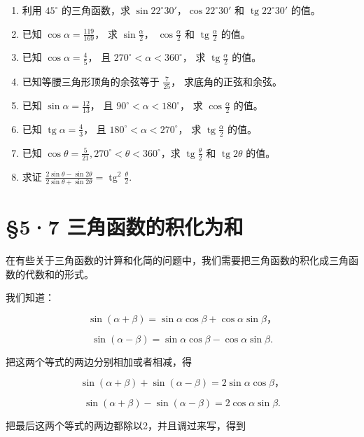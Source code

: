 \begin{enumerate}
\item
  利用 \(45^{\circ}\) 的三角函数，求
  \(\sin 22^{\circ}30'\)，\(\cos 22^{\circ}30'\) 和
  \(\operatorname{tg} 22^{\circ}30'\) 的值。
\item
  已知 \(\cos \alpha = \frac{119}{169}\)， 求
  \(\sin \frac{\alpha}{2}\)， \(\cos \frac{\alpha}{2}\) 和
  \(\operatorname{tg} \frac{\alpha}{2}\) 的值。
\item
  已知 \(\cos \alpha = \frac{4}{5}\)， 且
  \(270^{\circ} < \alpha < 360^{\circ}\)， 求
  \(\operatorname{tg} \frac{\alpha}{2}\) 的值。
\item
  已知等腰三角形顶角的余弦等于 \(\frac{7}{25}\)， 求底角的正弦和余弦。
\item
  已知 \(\sin \alpha = \frac{12}{13}\)， 且
  \(90^{\circ} < \alpha < 180^{\circ}\)， 求 \(\cos \frac{\alpha}{2}\)
  的值。
\item
  已知 \(\operatorname{tg} \alpha = \frac{4}{3}\)， 且
  \(180^{\circ} < \alpha < 270^{\circ}\)， 求
  \(\operatorname{tg} \frac{\alpha}{2}\) 的值。
\item
  已知
  \(\cos \theta = \frac{5}{21}, 270^\circ < \theta < 360^\circ\)，求
  \(\operatorname{tg} \frac{\theta}{2}\) 和
  \(\operatorname{tg} 2\theta\) 的值。
\item
  求证
  \(\frac{2\sin\theta - \sin 2\theta}{2\sin\theta + \sin 2\theta} = \operatorname{tg}^2\frac{\theta}{2}\).
\end{enumerate}

\section{§5·7 三角函数的积化为和}

在有些关于三角函数的计算和化简的问题中，我们需要把三角函数的积化成三角函数的代数和的形式。

我们知道：

\[
\sin (\alpha + \beta) = \sin \alpha \cos \beta + \cos \alpha \sin \beta \text{，}
\]

\[
\sin (\alpha - \beta) = \sin \alpha \cos \beta - \cos \alpha \sin \beta .
\]

把这两个等式的两边分别相加或者相减，得

\[
\sin (\alpha + \beta) + \sin (\alpha - \beta) = 2 \sin \alpha \cos \beta \text{，}
\]

\[
\sin (\alpha + \beta) - \sin (\alpha - \beta) = 2 \cos \alpha \sin \beta .
\]

把最后这两个等式的两边都除以2，并且调过来写，得到

